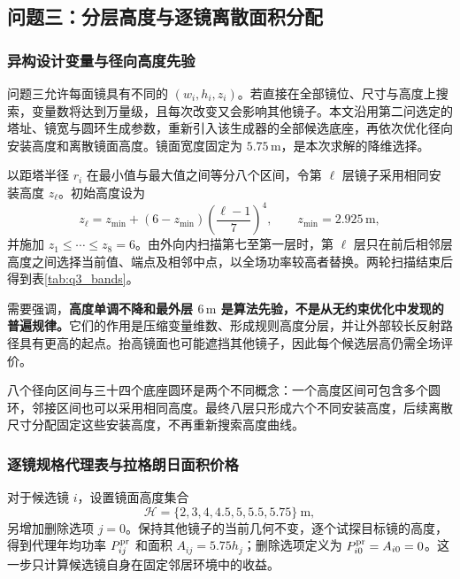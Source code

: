 \subsection{问题三：分层高度与逐镜离散面积分配}
\subsubsection{异构设计变量与径向高度先验}
问题三允许每面镜具有不同的 $(w_i,h_i,z_i)$。若直接在全部镜位、尺寸与高度上搜索，变量数将达到万量级，且每次改变又会影响其他镜子。本文沿用第二问选定的塔址、镜宽与圆环生成参数，重新引入该生成器的全部候选底座，再依次优化径向安装高度和离散镜面高度。镜面宽度固定为 $5.75\,\mathrm m$，是本次求解的降维选择。

以距塔半径 $r_i$ 在最小值与最大值之间等分八个区间，令第 $\ell$ 层镜子采用相同安装高度 $z_\ell$。初始高度设为
\begin{equation}
z_\ell=z_{\min}+(6-z_{\min})\left(\frac{\ell-1}{7}\right)^4,
\qquad z_{\min}=2.925\,\mathrm m,
\end{equation}
并施加 $z_1\le\cdots\le z_8=6$。由外向内扫描第七至第一层时，第 $\ell$ 层只在前后相邻层高度之间选择当前值、端点及相邻中点，以全场功率较高者替换。两轮扫描结束后得到表\ref{tab:q3_bands}。

需要强调，\textbf{高度单调不降和最外层 $6\,\mathrm m$ 是算法先验，不是从无约束优化中发现的普遍规律。}它们的作用是压缩变量维数、形成规则高度分层，并让外部较长反射路径具有更高的起点。抬高镜面也可能遮挡其他镜子，因此每个候选层高仍需全场评价。

八个径向区间与三十四个底座圆环是两个不同概念：一个高度区间可包含多个圆环，邻接区间也可以采用相同高度。最终八层只形成六个不同安装高度，后续离散尺寸分配固定这些安装高度，不再重新搜索高度曲线。

\pagepart
\subsubsection{逐镜规格代理表与拉格朗日面积价格}
对于候选镜 $i$，设置镜面高度集合
\begin{equation}
\mathcal H=\{2,3,4,4.5,5,5.5,5.75\}\ \mathrm m,
\end{equation}
另增加删除选项 $j=0$。保持其他镜子的当前几何不变，逐个试探目标镜的高度，得到代理年均功率 $P_{ij}^{\rm pr}$ 和面积 $A_{ij}=5.75h_j$；删除选项定义为 $P_{i0}^{\rm pr}=A_{i0}=0$。这一步只计算候选镜自身在固定邻居环境中的收益。


